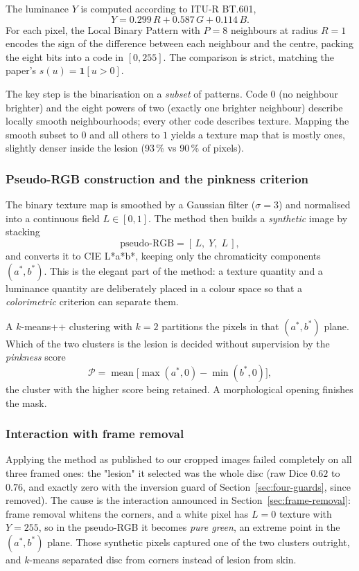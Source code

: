 \documentclass[11pt,a4paper]{article}
\begin{document}
The luminance $Y$ is computed according to ITU-R BT.601,
\[
Y = 0.299\,R + 0.587\,G + 0.114\,B .
\]
For each pixel, the Local Binary Pattern with $P = 8$ neighbours at radius
$R = 1$ encodes the sign of the difference between each neighbour and the
centre, packing the eight bits into a code in $[0, 255]$. The comparison is
strict, matching the paper's $s(u) = \mathbf{1}[u > 0]$.

The key step is the binarisation on a \emph{subset} of patterns. Code $0$ (no
neighbour brighter) and the eight powers of two (exactly one brighter neighbour)
describe locally smooth neighbourhoods; every other code describes texture.
Mapping the smooth subset to $0$ and all others to $1$ yields a texture map
that is mostly ones, slightly denser inside the lesion (93\,\% vs 90\,\% of
pixels).

\subsubsection{Pseudo-RGB construction and the pinkness criterion}

The binary texture map is smoothed by a Gaussian filter ($\sigma = 3$) and
normalised into a continuous field $L \in [0,1]$. The method then builds a
\emph{synthetic} image by stacking
\[
\text{pseudo-RGB} = [\,L,\; Y,\; L\,],
\]
and converts it to CIE L*a*b*, keeping only the chromaticity components
$(a^*, b^*)$. This is the elegant part of the method: a texture quantity and a
luminance quantity are deliberately placed in a colour space so that a
\emph{colorimetric} criterion can separate them.

A $k$-means++ clustering with $k = 2$ partitions the pixels in that $(a^*, b^*)$
plane. Which of the two clusters is the lesion is decided without supervision by
the \emph{pinkness} score
\[
\mathcal{P} = \operatorname{mean}\bigl[\max(a^*, 0) - \min(b^*, 0)\bigr],
\]
the cluster with the higher score being retained. A morphological opening
finishes the mask.

\subsubsection{Interaction with frame removal}
\label{sec:lbp-frame}

Applying the method as published to our cropped images failed completely on
all three framed ones: the "lesion" it selected was the whole disc (raw Dice
$0.62$ to $0.76$, and exactly zero with the inversion guard of
Section~\ref{sec:four-guards}, since removed). The cause is the interaction
announced in Section~\ref{sec:frame-removal}: frame removal whitens the corners, and a white pixel
has $L = 0$ texture with $Y = 255$, so in the pseudo-RGB it becomes
\emph{pure green}, an extreme point in the $(a^*, b^*)$ plane. Those synthetic
pixels captured one of the two clusters outright, and $k$-means separated disc
from corners instead of lesion from skin.
\end{document}
